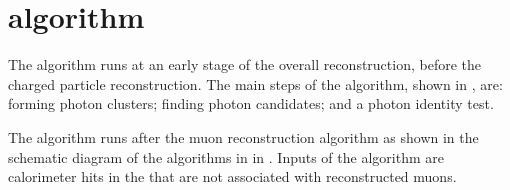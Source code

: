 



\section{\PhotonReconstruction algorithm}
\label{sec:photonRecostrcution}


The \PhotonReconstruction algorithm runs at an early stage of the overall reconstruction, before the charged particle reconstruction.  The main steps of the \PhotonReconstruction algorithm, shown in , are:  forming photon clusters; finding photon candidates; and a photon identity test.

The \PhotonReconstruction algorithm runs after the muon reconstruction algorithm as shown in the schematic diagram of the algorithms in \pandora in . Inputs of the \PhotonReconstruction algorithm are calorimeter hits in the \ECAL that are not associated with reconstructed muons.



